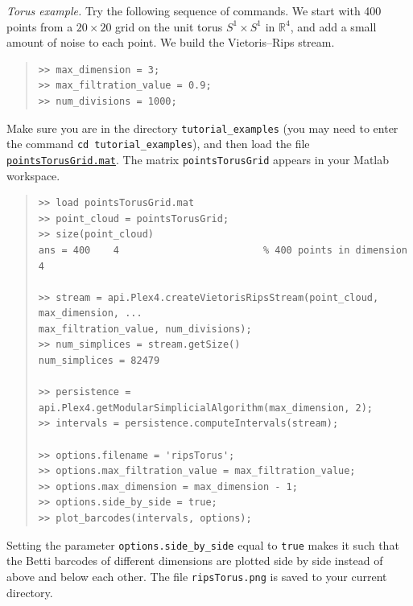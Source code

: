 \documentclass[amscd, amssymb, verbatim]{amsart}[12pt]
\theoremstyle{remark}
\theoremstyle{remark}
\theoremstyle{remark}
\newcommand{\R}{\mathbb{R}}
\begin{document}


{\em Torus example.} Try the following sequence of commands. We start with 400 points from a $20 \times 20$ grid on the unit torus $S^1 \times S^1$ in $\R^4$, and add a small amount of noise to each point.
We build the Vietoris--Rips stream.

\begin{quote} \begin{verbatim}
>> max_dimension = 3;
>> max_filtration_value = 0.9;
>> num_divisions = 1000;
\end{verbatim} \end{quote}

Make sure you are in the directory \texttt{tutorial\_examples} (you may need to enter the command \texttt{cd tutorial\_examples}), and then load the file \href{https://github.com/appliedtopology/javaplex/tree/master/src/matlab/for_distribution/tutorial_examples/pointsTorusGrid.mat}{\texttt{pointsTorusGrid.mat}}. The matrix \texttt{pointsTorusGrid} appears in your Matlab workspace.

\begin{quote} \begin{verbatim}
>> load pointsTorusGrid.mat
>> point_cloud = pointsTorusGrid;
>> size(point_cloud)
ans = 400    4                         % 400 points in dimension 4

>> stream = api.Plex4.createVietorisRipsStream(point_cloud, max_dimension, ...
max_filtration_value, num_divisions); 
>> num_simplices = stream.getSize()
num_simplices = 82479

>> persistence = api.Plex4.getModularSimplicialAlgorithm(max_dimension, 2);
>> intervals = persistence.computeIntervals(stream);

>> options.filename = 'ripsTorus';
>> options.max_filtration_value = max_filtration_value;
>> options.max_dimension = max_dimension - 1;
>> options.side_by_side = true;
>> plot_barcodes(intervals, options);
\end{verbatim} \end{quote}

Setting the parameter \texttt{options.side\_by\_side} equal to \texttt{true} makes it such that the Betti barcodes of different dimensions are plotted side by side instead of above and below each other. The file \texttt{ripsTorus.png} is saved to your current directory.
\end{document}
